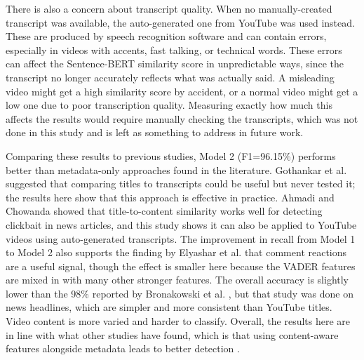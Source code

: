 \documentclass[conference]{IEEEtran}
\begin{document}
There is also a concern about transcript quality. When no manually-created transcript was available, the auto-generated one from YouTube was used instead. These are produced by speech recognition software and can contain errors, especially in videos with accents, fast talking, or technical words. These errors can affect the Sentence-BERT similarity score in unpredictable ways, since the transcript no longer accurately reflects what was actually said. A misleading video might get a high similarity score by accident, or a normal video might get a low one due to poor transcription quality. Measuring exactly how much this affects the results would require manually checking the transcripts, which was not done in this study and is left as something to address in future work.

Comparing these results to previous studies, Model 2 (F1=96.15\%) performs better than metadata-only approaches found in the literature. Gothankar et al. \cite{gothankar2022} suggested that comparing titles to transcripts could be useful but never tested it; the results here show that this approach is effective in practice. Ahmadi and Chowanda \cite{ahmadi2023} showed that title-to-content similarity works well for detecting clickbait in news articles, and this study shows it can also be applied to YouTube videos using auto-generated transcripts. The improvement in recall from Model 1 to Model 2 also supports the finding by Elyashar et al. \cite{elyashar2022} that comment reactions are a useful signal, though the effect is smaller here because the VADER features are mixed in with many other stronger features. The overall accuracy is slightly lower than the 98\% reported by Bronakowski et al. \cite{bronakowski2023}, but that study was done on news headlines, which are simpler and more consistent than YouTube titles. Video content is more varied and harder to classify. Overall, the results here are in line with what other studies have found, which is that using content-aware features alongside metadata leads to better detection \cite{bronakowski2023, bajaj2024}.
\end{document}
